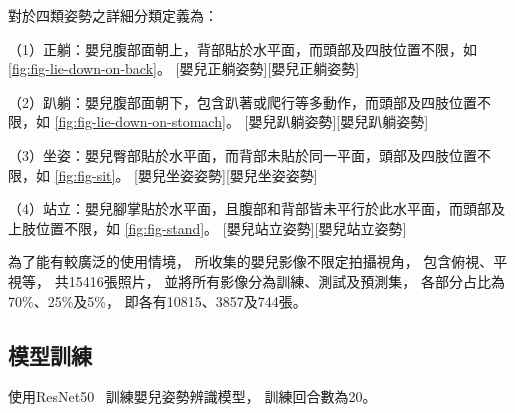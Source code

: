 \documentclass[class=NCU_thesis, crop=false]{standalone}
\begin{document}
對於四類姿勢之詳細分類定義為：

（1）正躺：嬰兒腹部面朝上，背部貼於水平面，而頭部及四肢位置不限，如
\cref{fig:fig-lie-down-on-back}。
[嬰兒正躺姿勢][嬰兒正躺姿勢]

（2）趴躺：嬰兒腹部面朝下，包含趴著或爬行等多動作，而頭部及四肢位置不限，如
\cref{fig:fig-lie-down-on-stomach}。
[嬰兒趴躺姿勢][嬰兒趴躺姿勢]

（3）坐姿：嬰兒臀部貼於水平面，而背部未貼於同一平面，頭部及四肢位置不限，如
\cref{fig:fig-sit}。
[嬰兒坐姿姿勢][嬰兒坐姿姿勢]

（4）站立：嬰兒腳掌貼於水平面，且腹部和背部皆未平行於此水平面，而頭部及上肢位置不限，如
\cref{fig:fig-stand}。
[嬰兒站立姿勢][嬰兒站立姿勢]

為了能有較廣泛的使用情境，
所收集的嬰兒影像不限定拍攝視角，
包含俯視、平視等，
共15416張照片，
並將所有影像分為訓練、測試及預測集，
各部分占比為70\%、25\%及5\%，
即各有10815、3857及744張。

\subsection{模型訓練}
使用ResNet50~\cite{he_deep_2016}
訓練嬰兒姿勢辨識模型，
訓練回合數為20。
\end{document}
